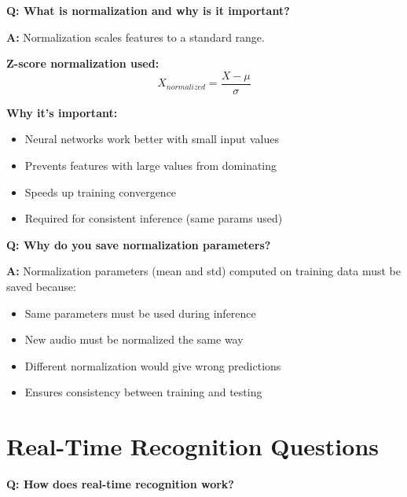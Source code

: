 \documentclass[a4paper,12pt]{article}
\newcommand{\vivaQ}[1]{\textcolor{questioncolor}{\textbf{Q: #1}}}
\newcommand{\vivaA}[1]{\textcolor{answercolor}{\textbf{A:}} #1}
\begin{document}
\vspace{0.5cm}

\vivaQ{What is normalization and why is it important?}

\vivaA{Normalization scales features to a standard range.

\textbf{Z-score normalization used:}
\[X_{normalized} = \frac{X - \mu}{\sigma}\]

\textbf{Why it's important:}
\begin{itemize}
    \item Neural networks work better with small input values
    \item Prevents features with large values from dominating
    \item Speeds up training convergence
    \item Required for consistent inference (same params used)
\end{itemize}}

\vspace{0.5cm}

\vivaQ{Why do you save normalization parameters?}

\vivaA{Normalization parameters (mean and std) computed on training data must be saved because:
\begin{itemize}
    \item Same parameters must be used during inference
    \item New audio must be normalized the same way
    \item Different normalization would give wrong predictions
    \item Ensures consistency between training and testing
\end{itemize}}

\section{Real-Time Recognition Questions}

\vivaQ{How does real-time recognition work?}
\end{document}
